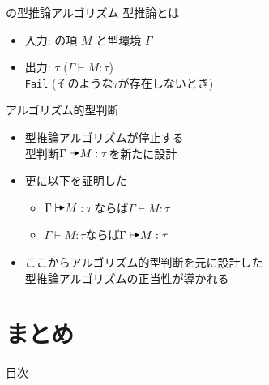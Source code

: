 \documentclass[dvipdfmx,aspectratio=169, 20pt]{beamer}
\begin{document}
\begin{frame}[fragile]{\LMD の型推論アルゴリズム}
    型推論とは
    \begin{itemize}
        \item 入力: \LMD の項 $M$ と型環境 $\Gamma$
        \item 出力: \( \tau \) \hspace{10mm} (\( \Gamma \vdash M : \tau \)) \\
            \hspace{10mm} \hspace{2mm} {\tt Fail} \hspace{1mm} (そのような\( \tau \)が存在しないとき)
    \end{itemize}

\end{frame}

\begin{frame}[fragile]{アルゴリズム的型判断}
    \begin{itemize}
    \item 型推論アルゴリズムが停止する\\
        型判断\( \Gamma \AV M : \tau \)を新たに設計
    \item 更に以下を証明した
    \begin{itemize}
            \item \( \Gamma \AV M : \tau \)ならば\( \Gamma \vdash M : \tau \)
            \item \( \Gamma \vdash M : \tau \)ならば\( \Gamma \AV M : \tau \)
    \end{itemize}

    \item ここからアルゴリズム的型判断を元に設計した\\型推論アルゴリズムの正当性が導かれる
    \end{itemize}
\end{frame}

\section{まとめ}

\begin{frame}{目次}
    \tableofcontents[currentsection]
\end{frame}
\end{document}
